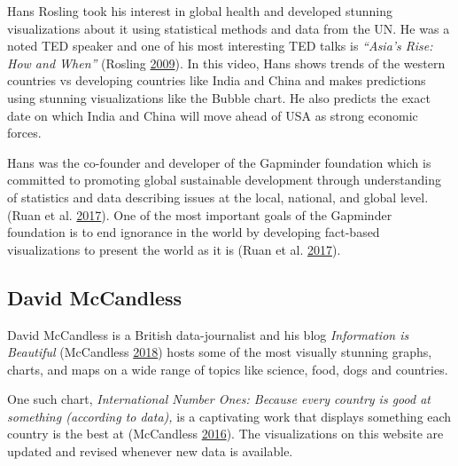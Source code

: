 \documentclass[]{book}
\theoremstyle{definition}
\theoremstyle{definition}
\theoremstyle{definition}
\theoremstyle{remark}
\begin{document}
Hans Rosling took his interest in global health and developed stunning
visualizations about it using statistical methods and data from the UN.
He was a noted TED speaker and one of his most interesting TED talks is
\emph{``Asia's Rise: How and When''} (Rosling
\protect\hyperlink{ref-hans}{2009}). In this video, Hans shows trends of
the western countries vs developing countries like India and China and
makes predictions using stunning visualizations like the Bubble chart.
He also predicts the exact date on which India and China will move ahead
of USA as strong economic forces.

Hans was the co-founder and developer of the Gapminder foundation which
is committed to promoting global sustainable development through
understanding of statistics and data describing issues at the local,
national, and global level. (Ruan et al.
\protect\hyperlink{ref-gapminder}{2017}). One of the most important
goals of the Gapminder foundation is to end ignorance in the world by
developing fact-based visualizations to present the world as it is (Ruan
et al. \protect\hyperlink{ref-gapminder}{2017}).

\subsection{David McCandless}\label{david-mccandless-1}

David McCandless is a British data-journalist and his blog
\emph{Information is Beautiful} (McCandless
\protect\hyperlink{ref-info_beautiful}{2018}) hosts some of the most
visually stunning graphs, charts, and maps on a wide range of topics
like science, food, dogs and countries.

One such chart, \emph{International Number Ones: Because every country
is good at something (according to data),} is a captivating work that
displays something each country is the best at (McCandless
\protect\hyperlink{ref-country_chart}{2016}). The visualizations on this
website are updated and revised whenever new data is available.
\end{document}

